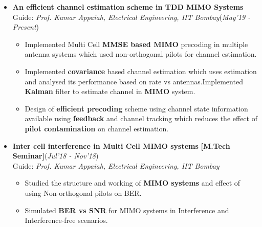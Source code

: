 \documentclass[10pt]{article}
\begin{document}

\vspace*{112pt}    %

\colorbox{bl}{}%

\begin{itemize}[leftmargin=0.4cm]


\item \textbf{An efficient channel estimation scheme in TDD MIMO Systems}\\
Guide: \textit{Prof. Kumar Appaiah, Electrical Engineering, IIT Bombay}\hfill{(\textit{May’19 - Present})}
    \begin{itemize}[leftmargin=0.5cm]
    \item Implemented Multi Cell \textbf{MMSE based MIMO }precoding in multiple antenna systems which used
non-orthogonal pilots for channel estimation.
    \item Implemented \textbf{covariance} based channel estimation which uses  estimation and analysed its performance based on rate vs antennas.Implemented \textbf{Kalman} filter to estimate channel in \textbf{MIMO} system.
    \item  Design of \textbf{efficient precoding }scheme using channel state information available using \textbf{feedback} and channel
tracking which reduces the effect of \textbf{pilot contamination} on channel estimation.

    \end{itemize}



\item \textbf{Inter cell interference in Multi Cell MIMO systems} \textbf{[M.Tech Seminar]}\hfill{(\textit{Jul'18 - Nov'18})}\\
Guide: \textit{Prof. Kumar Appaiah, Electrical Engineering, IIT Bombay}
    \begin{itemize}[leftmargin=0.5cm]
    \item Studied the structure and working of \textbf{MIMO systems} and effect of using Non-orthogonal pilots on BER.
    \item Simulated \textbf{BER vs SNR} for MIMO systems in Interference and Interference-free scenarios.
    \end{itemize}
    
\end{itemize}
\end{document}

